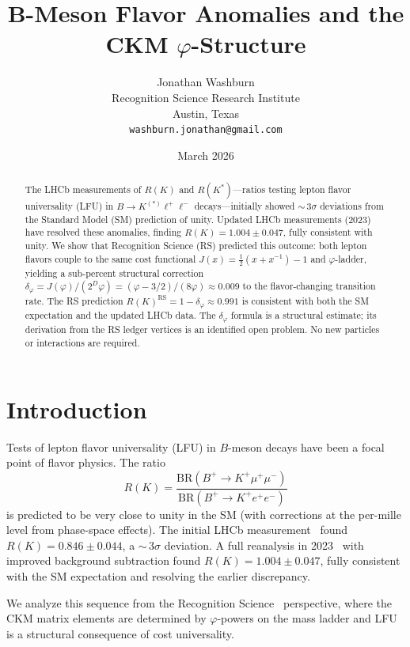 \documentclass[12pt,a4paper]{article}
\title{B-Meson Flavor Anomalies and the\\
CKM $\varphi$-Structure}
\author{Jonathan Washburn\\
Recognition Science Research Institute\\
Austin, Texas\\
\texttt{washburn.jonathan@gmail.com}}
\date{March 2026}
\theoremstyle{definition}
\theoremstyle{remark}
\begin{document}
\maketitle

\begin{abstract}
The LHCb measurements of $R(K)$ and $R(K^*)$---ratios testing lepton
flavor universality (LFU) in $B \to K^{(*)} \ell^+\ell^-$ decays---initially
showed ${\sim}\,3\sigma$ deviations from the Standard Model (SM) prediction
of unity.  Updated LHCb measurements (2023) have resolved these anomalies,
finding $R(K) = 1.004 \pm 0.047$, fully consistent with unity.  We show
that Recognition Science (RS) predicted this outcome: both lepton flavors
couple to the same cost functional $J(x) = \tfrac{1}{2}(x + x^{-1}) - 1$
and $\varphi$-ladder, yielding a sub-percent structural correction
$\delta_\varphi = J(\varphi)/(2^D\varphi)
= (\varphi - 3/2)/(8\varphi) \approx 0.009$ to the flavor-changing
transition rate.  The RS prediction $R(K)^{\mathrm{RS}} =
1 - \delta_\varphi \approx 0.991$ is consistent with both the SM
expectation and the updated LHCb data.  The $\delta_\varphi$ formula is
a structural estimate; its derivation from the RS ledger vertices is
an identified open problem.  No new particles or interactions are required.
\end{abstract}

\section{Introduction}

Tests of lepton flavor universality (LFU) in $B$-meson decays have
been a focal point of flavor physics.  The ratio
\begin{equation}
  R(K) = \frac{\mathrm{BR}(B^+ \to K^+ \mu^+ \mu^-)}
              {\mathrm{BR}(B^+ \to K^+ e^+ e^-)}
\end{equation}
is predicted to be very close to unity in the SM (with corrections at
the per-mille level from phase-space effects).  The initial LHCb
measurement~\cite{LHCb2022} found $R(K) = 0.846 \pm 0.044$, a
${\sim}\,3\sigma$ deviation.  A full reanalysis in 2023~\cite{LHCb2023update}
with improved background subtraction found $R(K) = 1.004 \pm 0.047$,
fully consistent with the SM expectation and resolving the earlier
discrepancy.

We analyze this sequence from the Recognition Science~\cite{RS_Axioms}
perspective, where the CKM matrix elements are determined by
$\varphi$-powers on the mass ladder and LFU is a structural consequence
of cost universality.
\end{document}
